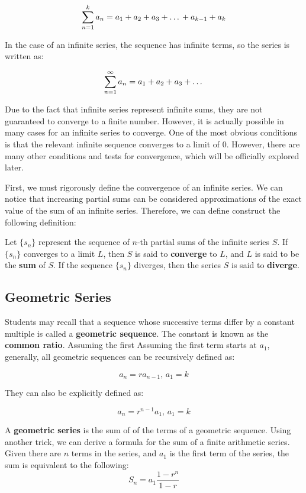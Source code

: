 \documentclass[11pt]{article}
\begin{document}
\[ \sum_{n=1}^{k} a_n = a_1 + a_2 + a_3 + \text{\dots} + a_{k-1} + a_k \]

In the case of an infinite series, the sequence has infinite terms, so the series is written as: 

\[ \sum_{n=1}^{\infty} a_n = a_1 + a_2 + a_3 + \text{\dots} \]

Due to the fact that infinite series represent infinite sums, they are not guaranteed to converge to a finite number. However, it is actually possible in many cases for an infinite series to converge. One of the most obvious conditions is that the relevant infinite sequence converges to a limit of $0$. However, there are many other conditions and tests for convergence, which will be officially explored later. 

First, we must rigorously define the convergence of an infinite series. We can notice that increasing partial sums can be considered approximations of the exact value of the sum of an infinite series. Therefore, we can define construct the following definition:\\

\begin{center}
Let $\{s_n\}$ represent the sequence of $n$-th partial sums of the infinite series $S$. If $\{s_n\}$ converges to a limit $L$, then $S$ is said to \textbf{converge} to $L$, and $L$ is said to be the \textbf{sum} of $S$. If the sequence $\{s_n\}$ diverges, then the series $S$ is said to \textbf{diverge}.
\end{center}
\vspace{0.5 cm}


\subsection{Geometric Series}
Students may recall that a sequence whose successive terms differ by a constant multiple is called a \textbf{geometric sequence}. The constant is known as the \textbf{common ratio}. Assuming the first Assuming the first term starts at $a_1$, generally, all geometric sequences can be recursively defined as:

\[ a_n = ra_{n-1}\text{, }a_1 = k\]

They can also be explicitly defined as:

\[ a_n = r^{n-1}a_1\text{, }a_1 = k \]

A \textbf{geometric series} is the sum of of the terms of a geometric sequence. Using another trick, we can derive a formula for the sum of a finite arithmetic series. Given there are $n$ terms in the series, and $a_1$ is the first term of the series, the sum is equivalent to the following:
\[ S_n = a_1 \frac{1-r^n}{1-r}\]
\end{document}
